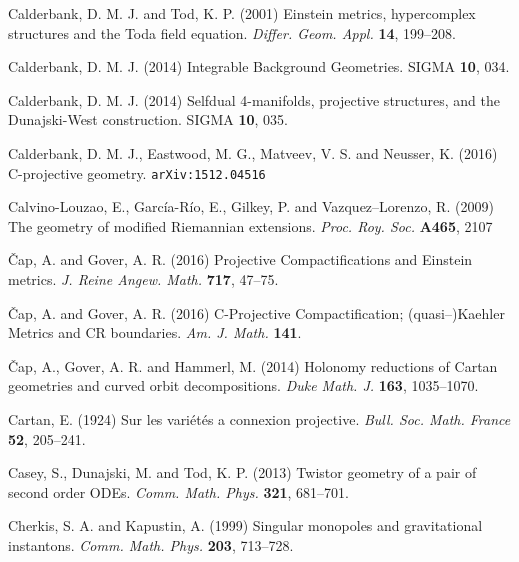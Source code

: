 \begin{thebibliography}{}
 Calderbank, D. M. J. and Tod,  K. P. (2001)
Einstein metrics, hypercomplex structures and the Toda field equation.
\textit{Differ. Geom. Appl.} {\bf 14},  199--208.

 Calderbank, D. M. J. (2014)
Integrable Background Geometries. SIGMA {\bf 10}, 034.

 Calderbank, D. M. J. (2014)
Selfdual 4-manifolds, projective structures, and the Dunajski-West construction. SIGMA {\bf 10}, 035.

 Calderbank,  D. M. J.,  Eastwood, M. G.,  Matveev, V. S. and 
Neusser, K.  (2016) C-projective geometry. {\tt arXiv:1512.04516}

 Calvino-Louzao, E., Garc\' ia-R\' io, E., Gilkey, P. and Vazquez--Lorenzo, R. (2009) The geometry of modified Riemannian extensions. \textit{Proc. Roy. Soc.} {\bf A465}, 2107

 \v Cap, A. and Gover, A. R. (2016)
Projective Compactifications and Einstein metrics.
\textit{J. Reine Angew. Math.} {\bf 717},  47--75.

 \v Cap, A. and Gover, A. R. (2016)
C-Projective Compactification; (quasi--)Kaehler Metrics and CR boundaries.
{\em  Am. J. Math.} {\bf 141}.

 \v Cap, A., Gover, A. R. and Hammerl, M. (2014) 
  Holonomy reductions of Cartan geometries and curved orbit
  decompositions. {\em Duke Math. J.} 
{\bf 163}, 1035--1070.
 
  



 Cartan, E. (1924)
Sur les vari\'et\'es a connexion projective.
\textit{Bull. Soc. Math. France} {\bf 52}, 205--241.


 Casey, S., Dunajski, M. and Tod, K. P. (2013)
Twistor geometry of a pair of second order ODEs. 
\textit{Comm. Math. Phys.} { \bf 321}, 681--701.



 Cherkis, S. A.  and Kapustin, A. (1999) Singular monopoles and gravitational
instantons. \textit{Comm. Math. Phys.} {\bf 203}, 713--728.




\end{thebibliography}
